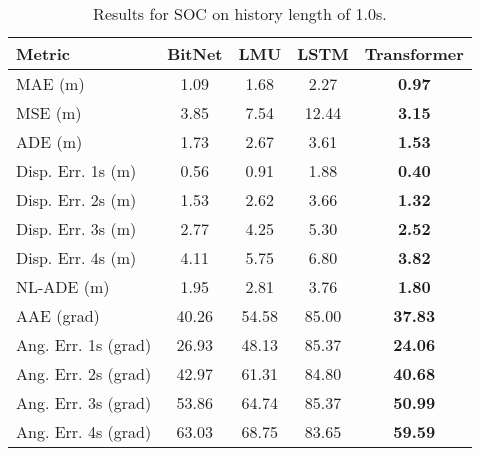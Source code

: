\begin{table}[H]
\centering
\caption{Results for SOC on history length of 1.0s.}
\label{hist:SOC_1.0s}
\begin{tabular}{l||c|c|c|c}
Metric & BitNet & LMU & LSTM & Transformer \\
\hline \hline
MAE (m) & 1.09 & 1.68 & 2.27 & \textbf{0.97} \\
MSE (m) & 3.85 & 7.54 & 12.44 & \textbf{3.15} \\
ADE (m) & 1.73 & 2.67 & 3.61 & \textbf{1.53} \\
Disp. Err. 1s (m) & 0.56 & 0.91 & 1.88 & \textbf{0.40} \\
Disp. Err. 2s (m) & 1.53 & 2.62 & 3.66 & \textbf{1.32} \\
Disp. Err. 3s (m) & 2.77 & 4.25 & 5.30 & \textbf{2.52} \\
Disp. Err. 4s (m) & 4.11 & 5.75 & 6.80 & \textbf{3.82} \\
NL-ADE (m) & 1.95 & 2.81 & 3.76 & \textbf{1.80} \\
AAE (grad) & 40.26 & 54.58 & 85.00 & \textbf{37.83} \\
Ang. Err. 1s (grad) & 26.93 & 48.13 & 85.37 & \textbf{24.06} \\
Ang. Err. 2s (grad) & 42.97 & 61.31 & 84.80 & \textbf{40.68} \\
Ang. Err. 3s (grad) & 53.86 & 64.74 & 85.37 & \textbf{50.99} \\
Ang. Err. 4s (grad) & 63.03 & 68.75 & 83.65 & \textbf{59.59} \\
\end{tabular}
\end{table}

